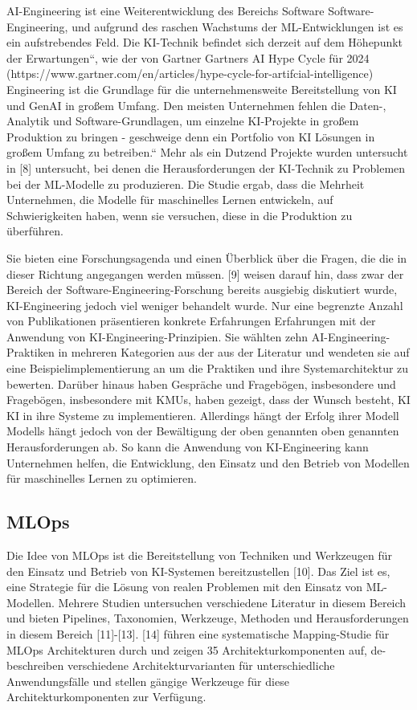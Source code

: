 \documentclass[11pt,a4paper,pointlessnumbers]{scrartcl}
\theoremstyle{break}
\numberwithin{equation}{section}
\begin{document}
AI-Engineering ist eine Weiterentwicklung des Bereichs Software
Software-Engineering, und aufgrund des raschen Wachstums der ML-Entwicklungen
ist es ein aufstrebendes Feld. Die KI-Technik befindet sich derzeit auf dem
Höhepunkt der Erwartungen“, wie der von Gartner
Gartners AI Hype Cycle für 2024 (https://www.gartner.com/en/articles/hype-cycle-for-artifcial-intelligence)
Engineering ist die Grundlage für die unternehmensweite Bereitstellung von KI und
GenAI in großem Umfang. Den meisten Unternehmen fehlen die Daten-, Analytik
und Software-Grundlagen, um einzelne KI-Projekte in großem
Produktion zu bringen - geschweige denn ein Portfolio von KI
Lösungen in großem Umfang zu betreiben.“ Mehr als ein Dutzend Projekte wurden untersucht in
[8] untersucht, bei denen die Herausforderungen der KI-Technik zu Problemen bei der
ML-Modelle zu produzieren. Die Studie ergab, dass die Mehrheit
Unternehmen, die Modelle für maschinelles Lernen entwickeln, auf
Schwierigkeiten haben, wenn sie versuchen, diese in die Produktion zu überführen. 

Sie bieten eine Forschungsagenda und einen Überblick über die Fragen, die
die in dieser Richtung angegangen werden müssen. [9] weisen darauf hin, dass zwar
der Bereich der Software-Engineering-Forschung bereits ausgiebig
diskutiert wurde, KI-Engineering jedoch viel weniger behandelt wurde. Nur
eine begrenzte Anzahl von Publikationen präsentieren konkrete Erfahrungen
Erfahrungen mit der Anwendung von KI-Engineering-Prinzipien. Sie
wählten zehn AI-Engineering-Praktiken in mehreren Kategorien aus der
aus der Literatur und wendeten sie auf eine Beispielimplementierung an
um die Praktiken und ihre Systemarchitektur zu bewerten.
Darüber hinaus haben Gespräche und Fragebögen, insbesondere
und Fragebögen, insbesondere mit KMUs, haben gezeigt, dass der Wunsch besteht, KI
KI in ihre Systeme zu implementieren. Allerdings hängt der Erfolg ihrer Modell
Modells hängt jedoch von der Bewältigung der oben genannten
oben genannten Herausforderungen ab. So kann die Anwendung von KI-Engineering
kann Unternehmen helfen, die Entwicklung, den Einsatz
und den Betrieb von Modellen für maschinelles Lernen zu optimieren.

\subsection{MLOps}
Die Idee von MLOps ist die Bereitstellung von Techniken und Werkzeugen für
den Einsatz und Betrieb von KI-Systemen bereitzustellen [10]. Das Ziel
ist es, eine Strategie für die Lösung von realen Problemen mit
den Einsatz von ML-Modellen. Mehrere Studien untersuchen verschiedene
Literatur in diesem Bereich und bieten Pipelines, Taxonomien, Werkzeuge,
Methoden und Herausforderungen in diesem Bereich [11]-[13].
[14] führen eine systematische Mapping-Studie für MLOps
Architekturen durch und zeigen 35 Architekturkomponenten auf, de-
beschreiben verschiedene Architekturvarianten für unterschiedliche Anwendungsfälle und
stellen gängige Werkzeuge für diese Architekturkomponenten zur Verfügung.
\end{document}

